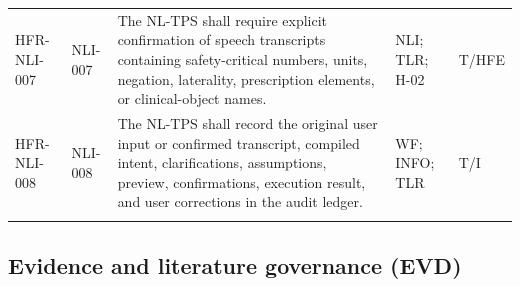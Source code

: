 \documentclass[11pt,letterpaper]{article}
\begin{document}
\begin{scriptsize}
\begin{longtable}{@{}L{0.14\textwidth}L{0.09\textwidth}L{0.47\textwidth}L{0.15\textwidth}L{0.07\textwidth}@{}}
\addlinespace[2pt]
\mbox{HFR-NLI-007} & \mbox{NLI-007} & The NL-TPS shall require explicit confirmation of speech transcripts containing safety-critical numbers, units, negation, laterality, prescription elements, or clinical-object names. & NLI; TLR; H-02 & T\slash\allowbreak{}HFE \\
\addlinespace[2pt]
\mbox{HFR-NLI-008} & \mbox{NLI-008} & The NL-TPS shall record the original user input or confirmed transcript, compiled intent, clarifications, assumptions, preview, confirmations, execution result, and user corrections in the audit ledger. & WF; INFO; TLR & T\slash\allowbreak{}I \\
\addlinespace[2pt]
\end{longtable}
\end{scriptsize}

\subsection{Evidence and literature governance (EVD)}
\end{document}
